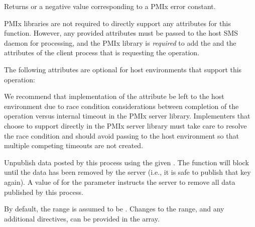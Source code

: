 \begin{arglist}
\end{arglist}

Returns  or a negative value corresponding to a PMIx error constant.

\reqattrstart
\ac{PMIx} libraries are not required to directly support any attributes for this function. However, any provided attributes must be passed to the host \ac{SMS} daemon for processing, and the \ac{PMIx} library is \textit{required} to add the  and the  attributes of the client process that is requesting the operation.

\reqattrend

\optattrstart
The following attributes are optional for host environments that support this operation:


\optattrend

\adviceimplstart
We recommend that implementation of the  attribute be left to the host environment due to race condition considerations between completion of the operation versus internal timeout in the \ac{PMIx} server library. Implementers that choose to support  directly in the \ac{PMIx} server library must take care to resolve the race condition and should avoid passing  to the host environment so that multiple competing timeouts are not created.
\adviceimplend


\descr

Unpublish data posted by this process using the given .
The function will block until the data has been removed by the server (i.e., it is safe to publish that key again).
A value of  for the  parameter instructs the server to remove all data published by this process.

By default, the range is assumed to be .
Changes to the range, and any additional directives, can be provided in the  array.


\subsection{}

